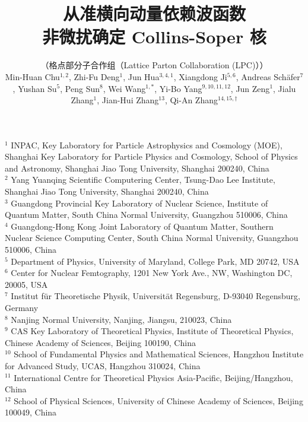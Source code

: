 \documentclass[11pt]{ctexart}
\begin{document}
\title{从准横向动量依赖波函数\\非微扰确定 Collins-Soper 核}
\author{%
（格点部分子合作组（Lattice Parton Collaboration (LPC)））\\[1mm]
Min-Huan Chu$^{1,2}$,
Zhi-Fu Deng$^{1}$,
Jun Hua$^{3,4,1}$,
Xiangdong Ji$^{5,6}$,
Andreas Sch\"afer$^{7}$,
Yushan Su$^{5}$,
Peng Sun$^{8}$,
Wei Wang$^{1,\ast}$,
Yi-Bo Yang$^{9,10,11,12}$,
Jun Zeng$^{1}$,
Jialu Zhang$^{1}$,
Jian-Hui Zhang$^{13}$,
Qi-An Zhang$^{14,15,\dagger}$%
}
\date{}
\maketitle

{\small
\baselineskip 11pt
\noindent
$^1$ INPAC, Key Laboratory for Particle Astrophysics and Cosmology (MOE),
Shanghai Key Laboratory for Particle Physics and Cosmology,
School of Physics and Astronomy, Shanghai Jiao Tong University, Shanghai 200240, China\\
$^2$ Yang Yuanqing Scientific Computering Center, Tsung-Dao Lee Institute,
Shanghai Jiao Tong University, Shanghai 200240, China\\
$^3$ Guangdong Provincial Key Laboratory of Nuclear Science, Institute of Quantum Matter,
South China Normal University, Guangzhou 510006, China\\
$^4$ Guangdong-Hong Kong Joint Laboratory of Quantum Matter, Southern Nuclear Science Computing Center,
South China Normal University, Guangzhou 510006, China\\
$^5$ Department of Physics, University of Maryland, College Park, MD 20742, USA\\
$^6$ Center for Nuclear Femtography, 1201 New York Ave., NW, Washington DC, 20005, USA\\
$^7$ Institut f\"ur Theoretische Physik, Universit\"at Regensburg, D-93040 Regensburg, Germany\\
$^8$ Nanjing Normal University, Nanjing, Jiangsu, 210023, China\\
$^9$ CAS Key Laboratory of Theoretical Physics, Institute of Theoretical Physics,
Chinese Academy of Sciences, Beijing 100190, China\\
$^{10}$ School of Fundamental Physics and Mathematical Sciences, Hangzhou Institute for Advanced Study,
UCAS, Hangzhou 310024, China\\
$^{11}$ International Centre for Theoretical Physics Asia-Pacific, Beijing/Hangzhou, China\\
$^{12}$ School of Physical Sciences, University of Chinese Academy of Sciences, Beijing 100049, China\\
}
\end{document}
